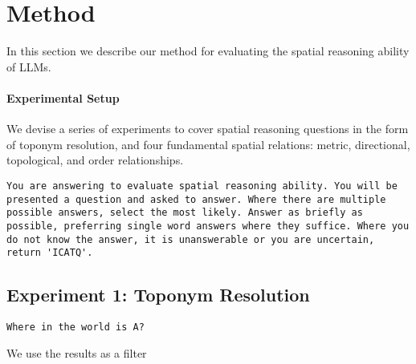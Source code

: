 \section{Method}
\label{section:method}

In this section we describe our method for evaluating the spatial reasoning ability of LLMs.


\paragraph{Experimental Setup}
We devise a series of experiments to cover spatial reasoning questions in the form of toponym resolution, and four fundamental spatial relations: metric, directional, topological, and order relationships.





\begin{lstlisting}[title=Prompt 1: Initial System Prompt]
    You are answering to evaluate spatial reasoning ability. You will be presented a question and asked to answer. Where there are multiple possible answers, select the most likely. Answer as briefly as possible, preferring single word answers where they suffice. Where you do not know the answer, it is unanswerable or you are uncertain, return 'ICATQ'.
\end{lstlisting}




\subsection{Experiment 1: Toponym Resolution}


\begin{lstlisting}[title=Prompt 2: Toponym Resolution Prompt]
    Where in the world is A?
\end{lstlisting}

We use the results as a filter



